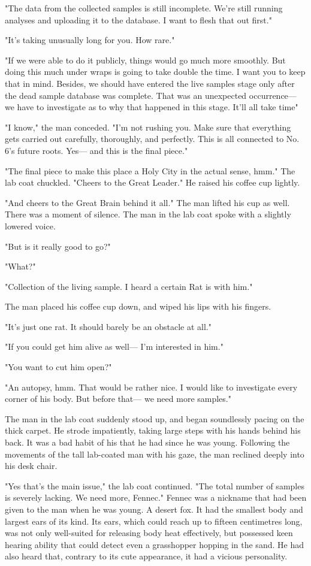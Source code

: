 "The data from the collected samples is still incomplete. We're still
running analyses and uploading it to the database. I want to flesh that
out first."

"It's taking unusually long for you. How rare."

"If we were able to do it publicly, things would go much more smoothly.
But doing this much under wraps is going to take double the time. I want
you to keep that in mind. Besides, we should have entered the live
samples stage only after the dead sample database was complete. That was
an unexpected occurrence--- we have to investigate as to why that happened
in this stage. It'll all take time\el "

"I know," the man conceded. "I'm not rushing you. Make sure that
everything gets carried out carefully, thoroughly, and perfectly. This
is all connected to No. 6's future roots. Yes--- and this is the final
piece."

"The final piece to make this place a Holy City in the actual sense,
hmm." The lab coat chuckled. "Cheers to the Great Leader." He raised his
coffee cup lightly.

"And cheers to the Great Brain behind it all." The man lifted his cup as
well. There was a moment of silence. The man in the lab coat spoke with
a slightly lowered voice.

"But is it really good to go?"

"What?"

"Collection of the living sample. I heard a certain Rat is with him."

The man placed his coffee cup down, and wiped his lips with his fingers.

"It's just one rat. It should barely be an obstacle at all."

"If you could get him alive as well--- I'm interested in him."

"You want to cut him open?"

"An autopsy, hmm. That would be rather nice. I would like to investigate
every corner of his body. But before that--- we need more samples."

The man in the lab coat suddenly stood up, and began soundlessly pacing
on the thick carpet. He strode impatiently, taking large steps with his
hands behind his back. It was a bad habit of his that he had since he
was young. Following the movements of the tall lab-coated man with his
gaze, the man reclined deeply into his desk chair.

"Yes that's the main issue," the lab coat continued. "The total number
of samples is severely lacking. We need more, Fennec." Fennec was a
nickname that had been given to the man when he was young. A desert fox.
It had the smallest body and largest ears of its kind. Its ears, which
could reach up to fifteen centimetres long, was not only well-suited for
releasing body heat effectively, but possessed keen hearing ability that
could detect even a grasshopper hopping in the sand. He had also heard
that, contrary to its cute appearance, it had a vicious personality.

